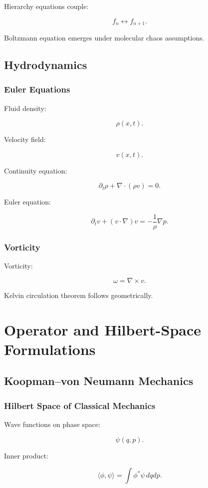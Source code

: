 \documentclass[11pt]{book}
\begin{document}
Hierarchy equations couple:

\[
f_n
\leftrightarrow
f_{n+1}.
\]

Boltzmann equation emerges under molecular chaos assumptions.

\chapter{Hydrodynamics}

\section{Euler Equations}

Fluid density:

\[
\rho(x,t).
\]

Velocity field:

\[
v(x,t).
\]

Continuity equation:

\[
\partial_t\rho
+
\nabla\cdot(\rho v)=0.
\]

Euler equation:

\[
\partial_t v
+
(v\cdot\nabla)v
=
-\frac1\rho\nabla p.
\]

\section{Vorticity}

Vorticity:

\[
\omega=\nabla\times v.
\]

Kelvin circulation theorem follows geometrically.

\part{Operator and Hilbert-Space Formulations}

\chapter{Koopman--von Neumann Mechanics}

\section{Hilbert Space of Classical Mechanics}

Wave functions on phase space:

\[
\psi(q,p).
\]

Inner product:

\[
\langle\phi,\psi\rangle
=
\int
\phi^*\psi\,dqdp.
\]
\end{document}
